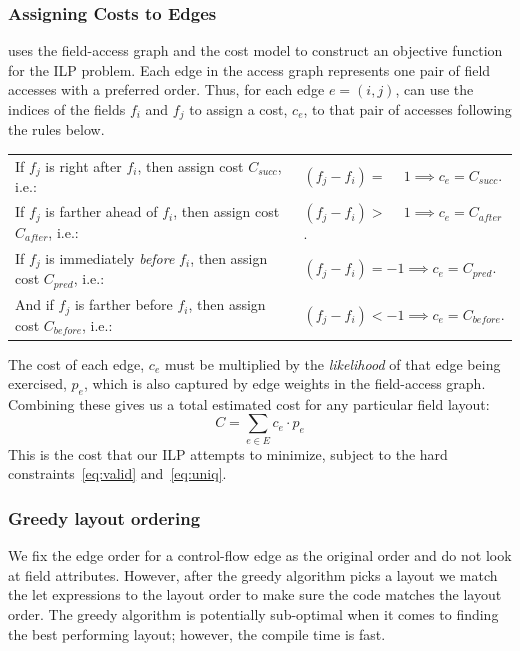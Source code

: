 \subsubsection{Assigning Costs to Edges}

\system uses the field-access graph and the cost model to construct an objective function for the ILP problem.
%
Each edge in the access graph represents one pair of field accesses with a preferred order. Thus, for each edge $e = (i, j)$, \system can use the indices of the fields $f_i$ and $f_j$ to assign a cost, $c_e$, to that pair of accesses following the rules below.
\begin{table}[h]
\centering
\begin{tabular}{ll}
If $f_j$ is right after $f_i$, then assign cost $C_\mathit{succ}$, i.e.:
&
$
(f_j - f_i) = \phantom{-}1 \implies c_e = C_\mathit{succ}
$.
\\
%
If $f_j$ is farther ahead of $f_i$, then assign cost $C_\mathit{after}$, i.e.:
&
$
(f_j - f_i) > \phantom{-}1 \implies c_e = C_\mathit{after}
$.
\\
%
If $f_j$ is immediately {\em before} $f_i$, then assign cost $C_\mathit{pred}$, i.e.:
&
$
(f_j - f_i) = -1 \implies c_e = C_\mathit{pred}
$.
\\
%
And if $f_j$ is farther before $f_i$, then assign cost $C_\mathit{before}$, i.e.:
&
$
(f_j - f_i) < -1 \implies c_e = C_\mathit{before}
$.
\end{tabular}
\end{table}

The cost of each edge, $c_e$ must be multiplied by the {\em likelihood} of that edge being exercised, $p_e$, which is also captured by edge weights in the field-access graph. Combining these gives us a total estimated cost for any particular field layout:
%
\begin{equation}
C = \sum_{e \in E} c_e \cdot p_e
\label{eq:objective}
\end{equation}
%
This is the cost that our ILP attempts to minimize, subject to the hard constraints~\ref{eq:valid} and~\ref{eq:uniq}.

\subsubsection{Greedy layout ordering}

We fix the edge order for a control-flow edge as the original order and do not look at field attributes. However, after the greedy algorithm picks a layout we match the let expressions to the layout order to make sure the code matches the layout order. The greedy algorithm is potentially sub-optimal when it comes to finding the best performing layout; however, the compile time is fast.

